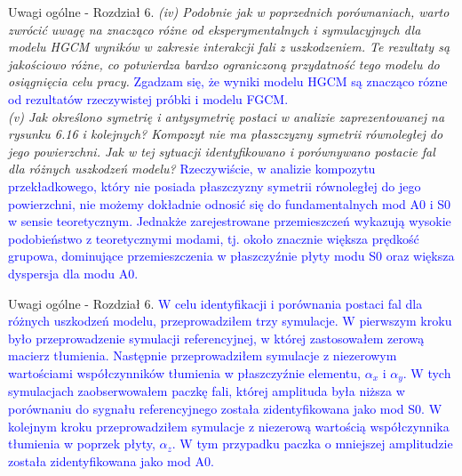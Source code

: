 \documentclass[10pt,aspectratio=169]{beamer} %
\begin{document}
\begin{frame}[label=frame28]{Uwagi ogólne - Rozdział 6.}\justifying
\textit{(iv) Podobnie jak w poprzednich porównaniach, warto zwrócić uwagę na znacząco różne od eksperymentalnych i symulacyjnych dla modelu HGCM wyników w zakresie interakcji fali z uszkodzeniem. Te rezultaty są jakościowo różne, co potwierdza bardzo ograniczoną przydatność tego modelu do osiągnięcia celu pracy.} \textcolor{blue} {Zgadzam się, że wyniki modelu HGCM są znacząco rózne od rezultatów rzeczywistej próbki i modelu FGCM.}\\
\textit{(v) Jak określono symetrię i antysymetrię postaci w analizie zaprezentowanej na	rysunku 6.16 i kolejnych? Kompozyt nie ma płaszczyzny symetrii równoległej do jego powierzchni. Jak w tej sytuacji identyfikowano i porównywano postacie fal dla różnych uszkodzeń modelu?} \textcolor{blue}{Rzeczywiście, w analizie kompozytu przekładkowego, który nie posiada płaszczyzny symetrii równoległej do jego powierzchni, nie możemy dokładnie odnosić się do fundamentalnych mod A0 i S0 w sensie teoretycznym. Jednakże zarejestrowane przemieszczeń wykazują wysokie podobieństwo z teoretycznymi modami, tj. około znacznie większa prędkość grupowa, dominujące przemieszczenia w płaszczyźnie płyty modu S0 oraz większa dyspersja dla modu A0.}
\end{frame}
\begin{frame}[label=frame28]{Uwagi ogólne - Rozdział 6.}\justifying
\textcolor{blue}{W celu identyfikacji i porównania postaci fal dla różnych uszkodzeń modelu, przeprowadziłem trzy symulacje. W pierwszym kroku było przeprowadzenie symulacji referencyjnej, w której zastosowałem zerową macierz tłumienia. Następnie przeprowadziłem symulacje z niezerowym wartościami współczynników tłumienia w płaszczyźnie elementu, \(\alpha_x\) i \(\alpha_y\). W tych symulacjach zaobserwowałem paczkę fali, której amplituda była niższa w porównaniu do sygnału referencyjnego została zidentyfikowana jako mod S0. W kolejnym kroku przeprowadziłem symulacje z niezerową wartością współczynnika tłumienia w poprzek płyty, \(\alpha_z\). W tym przypadku paczka o mniejszej amplitudzie została zidentyfikowana jako mod A0.}
\end{frame}	
\end{document}
